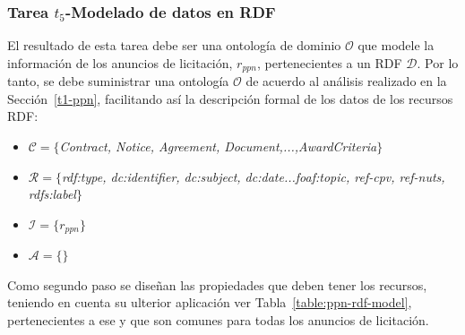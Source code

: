 \subsubsection{Tarea $t_5$-Modelado de datos en RDF}
El resultado de esta tarea debe ser una ontología de dominio $\mathcal{O}$ que modele la información 
de los anuncios de licitación, $r_{ppn}$, pertenecientes a un \dataset RDF $\mathcal{D}$. Por lo tanto, se debe 
suministrar una ontología $\mathcal{O}$ de acuerdo al análisis realizado en la Sección~\ref{t1-ppn}, facilitando 
así la descripción formal de los datos de los recursos \gls{RDF}:
% 
 \begin{itemize}
  \item $\mathcal{C} = \{$\textit{Contract, Notice, Agreement, Document,...,AwardCriteria}$\}$
  \item $\mathcal{R} = \{$\textit{rdf:type, dc:identifier, dc:subject, dc:date...foaf:topic, ref-cpv, ref-nuts, rdfs:label}$\}$
  \item $\mathcal{I} = \{ r_{ppn} \}$
  \item $\mathcal{A} = \{\}$
 \end{itemize}
%  
 Como segundo paso se diseñan las propiedades que deben tener los recursos, teniendo en cuenta su ulterior aplicación ver 
Tabla~\ref{table:ppn-rdf-model},  pertenecientes a ese \dataset y que son comunes para todas los anuncios de licitación.
% 
